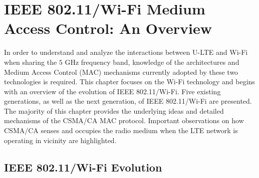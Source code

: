 %
%
%
\chapter{IEEE 802.11/Wi-Fi Medium Access Control: An Overview}
\label{overview-wifi}


In order to understand and analyze the interactions between U-LTE and Wi-Fi when sharing the $5$ GHz frequency band, knowledge of the architectures and Medium Access Control (MAC) mechanisms currently adopted by these two technologies is required. This chapter focuses on the Wi-Fi technology and begins with an overview of the evolution of IEEE 802.11/Wi-Fi. Five existing generations, as well as the next generation, of IEEE 802.11/Wi-Fi are presented. The majority of this chapter provides the underlying ideas and detailed mechanisms of the CSMA/CA MAC protocol. Important observations on how CSMA/CA senses and occupies the radio medium when the LTE network is operating in vicinity are highlighted.

\section{IEEE 802.11/Wi-Fi Evolution}
\label{wifi-lbt}


